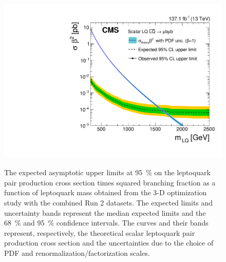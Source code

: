 \begin{figure}[H]
    \centering
    {\includegraphics[width=.48\textwidth]{Images/Analysis/3D_Opt_Limits/BR_Sigma_MuMu_2016-2018.pdf}}
    \caption{The expected asymptotic upper limits at \SI{95}{\%} \CL on the leptoquark pair production cross section times squared branching fraction as a function of leptoquark mass obtained from the 3-D optimization study with the combined Run 2 datasets. The expected limits and uncertainty bands represent the median expected limits and the \SI{68}{\%} and \SI{95}{\%} confidence intervals. The \xsecTheory curves and their bands represent, respectively, the theoretical scalar leptoquark pair production cross section and the uncertainties due to the choice of PDF and renormalization/factorization scales.}
    \label{figapp:cutandcountlimitsrun2}
\end{figure}